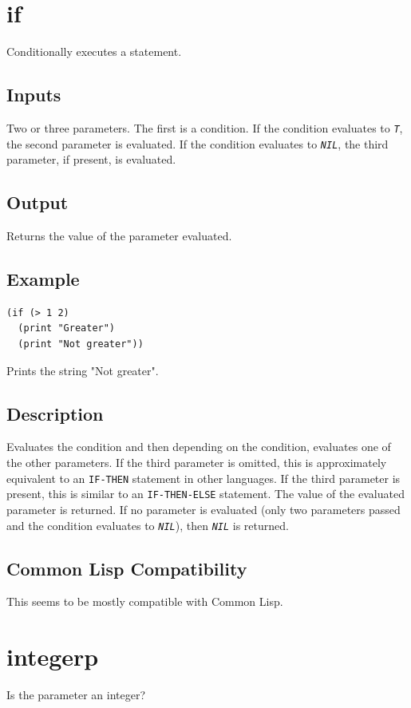 \documentclass[10pt, openany]{book}
\newcommand{\constant}[1]{\emph{\texttt{#1}}}
\newcommand{\keyword}[1]{\texttt{#1}}
\newcommand{\cl}{Common Lisp}
\begin{document}
\section{if}
Conditionally executes a statement.
\subsection{Inputs}
Two or three parameters.  The first is a condition.  If the condition evaluates to \constant{T}, the second parameter is evaluated.  If the condition evaluates to \constant{NIL}, the third parameter, if present, is evaluated.
\subsection{Output}
Returns the value of the parameter evaluated.
\subsection{Example}
\begin{lstlisting}
(if (> 1 2)
  (print "Greater")
  (print "Not greater"))
\end{lstlisting}
Prints the string "Not greater".
\subsection{Description}
Evaluates the condition and then depending on the condition, evaluates one of the other parameters.  If the third parameter is omitted, this is approximately equivalent to an \keyword{IF-THEN} statement in other languages.  If the third parameter is present, this is similar to an \keyword{IF-THEN-ELSE} statement.  The value of the evaluated parameter is returned.  If no parameter is evaluated (only two parameters passed and the condition evaluates to \constant{NIL}), then \constant{NIL} is returned.
\subsection{Common Lisp Compatibility}
This seems to be mostly compatible with \cl.

\section{integerp}
Is the parameter an integer?
\end{document}

